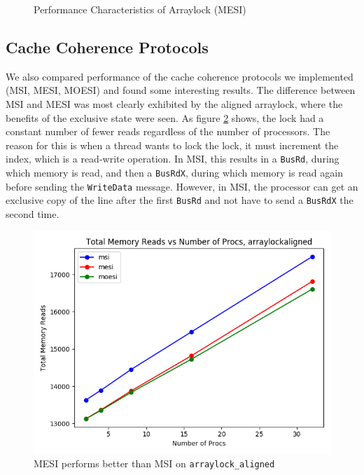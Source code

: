 \documentclass{article}
\def\inline{\lstinline[language=C++, basicstyle=\ttfamily]}
\begin{document}
\begin{figure}[h]%
    \centering
    \qquad
    \caption{Performance Characteristics of Arraylock (MESI)}
    \label{fig:arraylock}
\end{figure}

\subsection{Cache Coherence Protocols}

We also compared performance of the cache coherence protocols we implemented (MSI, MESI, MOESI) and found some interesting results. The difference between MSI and MESI was most clearly exhibited by the aligned arraylock, where the benefits of the exclusive state were seen.  As figure \ref{fig:mesi} shows, the lock had a constant number of fewer reads regardless of the number of processors.  The reason for this is when a thread wants to lock the lock, it must increment the index, which is a read-write operation.  In MSI, this results in a \inline{BusRd}, during which memory is read, and then a \inline{BusRdX}, during which memory is read again before sending the \inline{WriteData} message.  However, in MSI, the processor can get an exclusive copy of the line after the first \inline{BusRd} and not have to send a \inline{BusRdX} the second time.

\begin{figure}[h]
\centering
\includegraphics[width=.5\textwidth]{figures/arraylock_mem.png}
\caption{MESI performs better than MSI on \inline{arraylock_aligned}}
\label{fig:mesi}
\end{figure}
\end{document}

